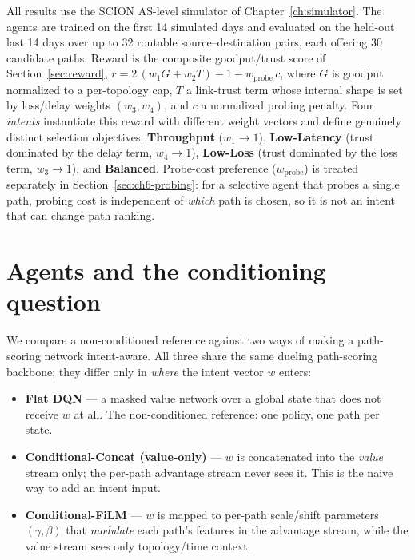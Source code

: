 All results use the SCION AS-level simulator of Chapter~\ref{ch:simulator}. The
agents are trained on the first 14 simulated days and evaluated on the held-out
last 14 days over up to 32 routable source--destination pairs, each offering 30
candidate paths. Reward is the composite goodput/trust score of
Section~\ref{sec:reward}, $r = 2\,(w_1 G + w_2 T) - 1 - w_{\text{probe}}\,c$,
where $G$ is goodput normalized to a per-topology cap, $T$ a link-trust term
whose internal shape is set by loss/delay weights $(w_3,w_4)$, and $c$ a
normalized probing penalty. Four \emph{intents} instantiate this reward with
different weight vectors and define genuinely distinct selection objectives:
\textbf{Throughput} ($w_1\!\to\!1$), \textbf{Low-Latency} (trust dominated by the
delay term, $w_4\!\to\!1$), \textbf{Low-Loss} (trust dominated by the loss term,
$w_3\!\to\!1$), and \textbf{Balanced}. Probe-cost preference ($w_{\text{probe}}$)
is treated separately in Section~\ref{sec:ch6-probing}: for a selective agent
that probes a single path, probing cost is independent of \emph{which} path is
chosen, so it is not an intent that can change path ranking.

\section{Agents and the conditioning question}
\label{sec:ch6-agents}

We compare a non-conditioned reference against two ways of making a
path-scoring network intent-aware. All three share the same dueling path-scoring
backbone; they differ only in \emph{where} the intent vector $w$ enters:
\begin{itemize}
  \item \textbf{Flat DQN} — a masked value network over a global state that does
  not receive $w$ at all. The non-conditioned reference: one policy, one path
  per state.
  \item \textbf{Conditional-Concat (value-only)} — $w$ is concatenated into the
  \emph{value} stream only; the per-path advantage stream never sees it. This is
  the naive way to add an intent input.
  \item \textbf{Conditional-FiLM} — $w$ is mapped to per-path scale/shift
  parameters $(\gamma,\beta)$ that \emph{modulate} each path's features in the
  advantage stream, while the value stream sees only topology/time context.
\end{itemize}

